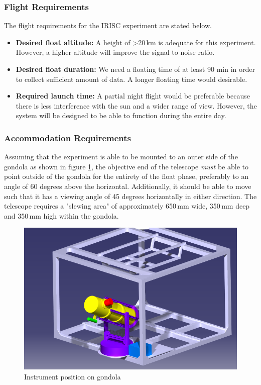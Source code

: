 \subsubsection{Flight Requirements}
The flight requirements for the IRISC experiment are stated below.
\begin{itemize}
	\item \textbf{Desired float altitude:} A height of >20\,km is adequate for this experiment. However, a higher altitude will improve the signal to noise ratio.
	\item \textbf{Desired float duration:} We need a floating time of at least 90 min in order to collect sufficient amount of data. A longer floating time would desirable.
	\item \textbf{Required launch time:} A partial night flight would be preferable because there is less interference with the sun and a wider range of view. However, the system will be designed to be able to function during the entire day.
\end{itemize}

\subsubsection{Accommodation Requirements}

Assuming that the experiment is able to be mounted to an outer side of the gondola as shown in figure \ref{accomrec}, the objective end of the telescope \textit{must} be able to point outside of the gondola for the entirety of the float phase, preferably to an angle of 60 degrees above the horizontal. Additionally, it should be able to move such that it has a viewing angle of 45 degrees horizontally in either direction. The telescope requires a "slewing area" of approximately 650\,mm wide, 350\,mm deep and 350\,mm high within the gondola.

\begin{figure}[H]
	\centering
	\includegraphics[width=0.9\linewidth]{4-experiment-design/img/mechanical/Assembly_v3iso2.png}
	\caption{Instrument position on gondola}
	\label{accomrec}
\end{figure}
